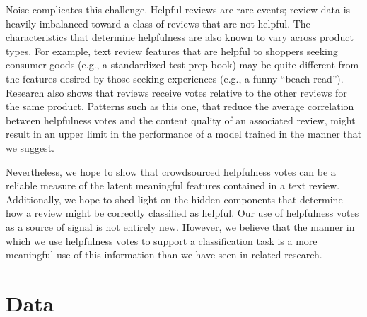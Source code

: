 \documentclass[10pt, a4paper, twocolumn]{article}
\begin{document}
Noise complicates this challenge. Helpful reviews are rare events; review data is heavily imbalanced toward a class of reviews that are not helpful. The characteristics that determine helpfulness are also known to vary across product types\cite{diaz_ng_2018}. For example, text review features that are helpful to shoppers seeking consumer goods (e.g., a standardized test prep book) may be quite different from the features desired by those seeking experiences (e.g., a funny “beach read”).  Research also shows that reviews receive votes relative to the other reviews for the same product. Patterns such as this one, that reduce the average correlation between helpfulness votes and the content quality of an associated review, might result in an upper limit in the performance of a model trained in the manner that we suggest.

Nevertheless, we hope to show that crowdsourced helpfulness votes can be a reliable measure of the latent meaningful features contained in a text review. Additionally, we hope to shed light on the hidden components that determine how a review might be correctly classified as helpful. Our use of helpfulness votes as a source of signal is not entirely new. However, we believe that the manner in which we use helpfulness votes to support a classification task is a more meaningful use of this information than we have seen in related research.

\section{Data}
\end{document}
